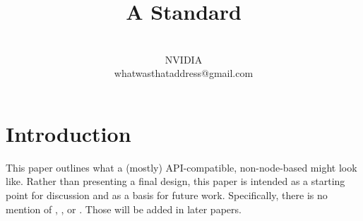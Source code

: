 \documentclass{article}
\begin{document}
\title{\textbf{\Large A Standard }}
\author{
  \\NVIDIA\\whatwasthataddress@gmail.com\\
}
\date{}
\maketitle


\section{Introduction}
\label{sec:intro}

This paper outlines what a (mostly) API-compatible, non-node-based 
might look like.  Rather than presenting a final design, this paper is
intended as a starting point for discussion and as a basis for future work.
Specifically, there is no mention of , , or
.  Those will be added in later papers.




\end{document}
